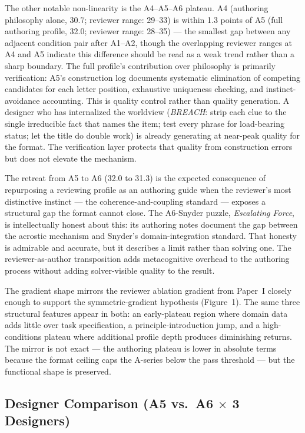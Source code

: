 The other notable non-linearity is the A4--A5--A6 plateau. A4 (authoring philosophy alone, 30.7; reviewer range: 29--33) is within 1.3 points of A5 (full authoring profile, 32.0; reviewer range: 28--35) --- the smallest gap between any adjacent condition pair after A1--A2, though the overlapping reviewer ranges at A4 and A5 indicate this difference should be read as a weak trend rather than a sharp boundary. The full profile's contribution over philosophy is primarily verification: A5's construction log documents systematic elimination of competing candidates for each letter position, exhaustive uniqueness checking, and instinct-avoidance accounting. This is quality control rather than quality generation. A designer who has internalized the worldview (\textit{BREACH}: strip each clue to the single irreducible fact that names the item; test every phrase for load-bearing status; let the title do double work) is already generating at near-peak quality for the format. The verification layer protects that quality from construction errors but does not elevate the mechanism.

The retreat from A5 to A6 (32.0 to 31.3) is the expected consequence of repurposing a reviewing profile as an authoring guide when the reviewer's most distinctive instinct --- the coherence-and-coupling standard --- exposes a structural gap the format cannot close. The A6-Snyder puzzle, \textit{Escalating Force}, is intellectually honest about this: its authoring notes document the gap between the acrostic mechanism and Snyder's domain-integration standard. That honesty is admirable and accurate, but it describes a limit rather than solving one. The reviewer-as-author transposition adds metacognitive overhead to the authoring process without adding solver-visible quality to the result.

The gradient shape mirrors the reviewer ablation gradient from Paper~I closely enough to support the symmetric-gradient hypothesis (Figure~1). The same three structural features appear in both: an early-plateau region where domain data adds little over task specification, a principle-introduction jump, and a high-conditions plateau where additional profile depth produces diminishing returns. The mirror is not exact --- the authoring plateau is lower in absolute terms because the format ceiling caps the A-series below the pass threshold --- but the functional shape is preserved.

\subsection{Designer Comparison (A5 vs.\ A6 $\times$ 3 Designers)}


